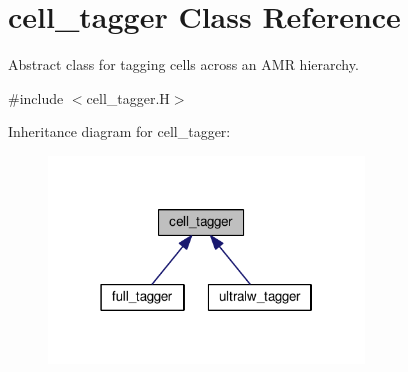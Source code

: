 \hypertarget{classcell__tagger}{}\section{cell\+\_\+tagger Class Reference}
\label{classcell__tagger}


Abstract class for tagging cells across an A\+MR hierarchy.  




{\ttfamily \#include $<$cell\+\_\+tagger.\+H$>$}



Inheritance diagram for cell\+\_\+tagger\+:\nopagebreak
\begin{figure}[H]
\begin{center}
\leavevmode
\includegraphics[width=238pt]{classcell__tagger__inherit__graph}
\end{center}
\end{figure}
